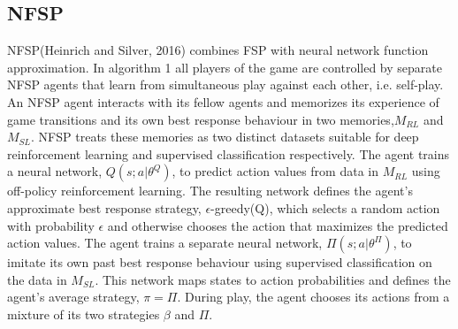 \documentclass{article}
\begin{document}
\subsection{NFSP}
NFSP(Heinrich and Silver, 2016) combines FSP with neural network function approximation. In algorithm 1 all players of the game are controlled by separate NFSP agents that learn from simultaneous play against each
other, i.e. self-play. An NFSP agent interacts with its fellow agents and memorizes its experience
of game transitions and its own best response behaviour in two memories,$M_{RL}$ and $M_{SL}$. NFSP
treats these memories as two distinct datasets suitable for deep reinforcement learning and supervised
classification respectively. The agent trains a neural network, $Q(s;a | \theta^Q)$, to predict action values from data in $M_{RL}$ using off-policy reinforcement learning. The resulting network defines the agent’s approximate best response strategy, $\epsilon$-greedy(Q), which selects a random action with probability $\epsilon$ and otherwise chooses the action that maximizes the predicted action values. The agent trains a separate neural network, $\Pi(s;a |\theta^{\Pi})$, to imitate its own past best response behaviour using supervised classification on the data in $M_{SL}$. This network maps states to action probabilities and defines the agent’s average strategy, $\pi = \Pi$. During play, the agent chooses its actions from a mixture of its two strategies $\beta$ and $\Pi$.
\end{document}

